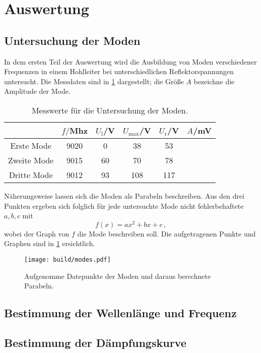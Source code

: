 \section{Auswertung}
\label{sec:Auswertung}

\subsection{Untersuchung der Moden}
\label{subsec:auswertungModen}
In dem ersten Teil der Auswertung wird die Ausbildung von Moden verschiedener Frequenzen in einem Hohlleiter bei unterschiedlichen Reflektorspannungen untersucht. Die Messdaten sind in \ref{tab:moden} dargestellt; die Größe $A$ bezeichne die Amplitude der Mode.\\

\begin{table}
\centering
\caption{Messwerte für die Untersuchung der Moden.}
\label{tab:moden}
\begin{tabular}{c c c c c c}
\toprule
& $f/$Mhz & $U_\text{l}$/V  & $U_\text{max}$/V & $U_\text{r}$/V & $A$/mV \\
\midrule
 Erste Mode & 9020 &  0 & 38  & 53\tabularnewline
Zweite Mode & 9015 & 60 & 70  & 78\tabularnewline
Dritte Mode & 9012 & 93 & 108 & 117\tabularnewline
\bottomrule
\end{tabular}
\end{table}

Näherungsweise lassen sich die Moden als Parabeln beschreiben. Aus den drei Punkten ergeben sich folglich für jede untersuchte Mode nicht fehlerbehaftete $a, b, c$ mit
\begin{equation}
  f(x) = ax^2 + bx + c\,,
\end{equation}
wobei der Graph von $f$ die Mode beschreiben soll.
Die aufgetragenen Punkte und Graphen sind in \ref{fig:moden} ersichtlich.

\begin{figure}
  \centering
  \texttt{[image: build/modes.pdf]}
  \caption{Aufgenomme Datepunkte der Moden und daraus berechnete Parabeln.}
  \label{fig:moden}
\end{figure}

\subsection{Bestimmung der Wellenlänge und Frequenz}
\label{subsec:auswertungfrequenz}


\subsection{Bestimmung der Dämpfungskurve}
\label{subsec:auswertungdämpfung}

